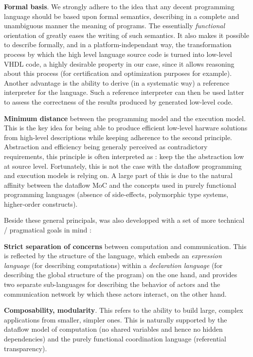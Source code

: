 \medskip
\textbf{Formal basis}. We strongly adhere to the idea that any decent programming language should be
based upon formal semantics, describing in a complete and unambiguous manner the meaning of
programs. The essentially \emph{functional} orientation of \caph greatly eases the
writing of such semantics. It also makes it possible to describe formally, and
in a platform-independant way, the transformation process by which the high level language source
code is turned into low-level VHDL code, a highly desirable property in our case, since it allows 
reasoning about this process (for certification and optimization purposes for example). Another
advantage is the ability to derive (in a systematic way) a reference interpreter for the
language. Such a reference interpreter can then be used latter to assess the correctness of the
results produced by generated low-level code.

\medskip
\textbf{Minimum distance} between the programming model and the execution model. This is the key
idea for being able to produce efficient low-level harware solutions from high-level descriptions
while keeping adherence to the second principle. Abstraction and efficiency being generaly
perceived as contradictory requirements, this principle is often interpreted as : keep the the
abstraction low at source level. Fortunately, this is not the case with the dataflow programming
and execution models \caph is relying on. A large part of this is due to the natural affinity
between the dataflow MoC and the concepts used in purely functional programming languages (absence
of side-effects, polymorphic type systems, higher-order constructs).

\medskip
Beside these general principals, \caph was also developped with a set of more technical / pragmatical
goals in mind :

\medskip
\textbf{Strict separation of concerns} between computation and communication. This is reflected by
the structure of the language, which embeds an
\emph{expression language} (for describing computations) within
a \emph{declaration language} (for describing the global structure of the program) on the one hand,
and provides two separate sub-languages for describing the behavior of actors and the communication
network by which these actors interact, on the other hand.

\medskip
\textbf{Composability, modularity}. This refers to the ability to build large, complex applications
from smaller, simpler ones. This is naturally supported by the dataflow model of computation (no
shared variables and hence no hidden dependencies) and the purely functional coordination language
(referential transparency).

